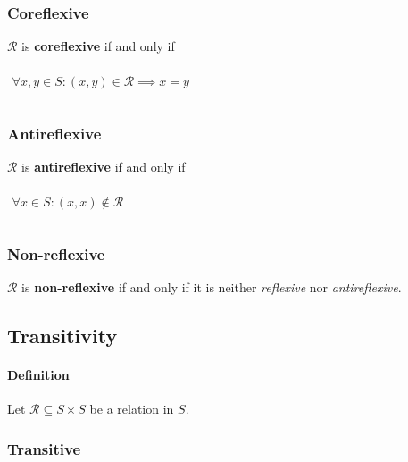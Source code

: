 \subsubsection{Coreflexive}

$\mathcal{R}$ is \textbf{coreflexive} if and only if

\begin{math}
  \begin{array}{c}
    \\
    \forall x, y \in S : (x, y) \in \mathcal{R} \implies x = y\\
    \\
  \end{array}
\end{math}



\subsubsection{Antireflexive}

$\mathcal{R}$ is \textbf{antireflexive} if and only if

\begin{math}
  \begin{array}{c}
    \\
    \forall x \in S: (x, x) \notin \mathcal{R}\\
    \\
  \end{array}
\end{math}



\subsubsection{Non-reflexive}

$\mathcal{R}$ is \textbf{non-reflexive} if and only if it is neither
\textit{reflexive} nor \textit{antireflexive}.


\subsection{Transitivity}
\label{sec:transitivity}

\paragraph{Definition}

Let $\mathcal{R} \subseteq S \times S$ be a relation in $S$.

\subsubsection{Transitive}

